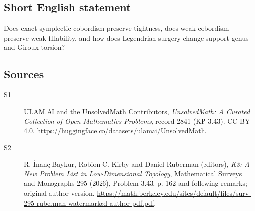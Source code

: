 \documentclass[11pt]{article}
\begin{document}
\subsection{Short English statement}
Does exact symplectic cobordism preserve tightness, does weak cobordism preserve weak fillability, and how does Legendrian surgery change support genus and Giroux torsion?
\subsection{Sources}
\begin{description}
\item[\hypertarget{source:2841:1}{S1}] ULAM.AI and the UnsolvedMath Contributors, \emph{UnsolvedMath: A Curated Collection of Open Mathematics Problems}, record 2841 (KP-3.43). CC BY 4.0. \url{https://huggingface.co/datasets/ulamai/UnsolvedMath}.
\item[\hypertarget{source:2841:2}{S2}] R. İnanç Baykur, Robion C. Kirby and Daniel Ruberman (editors), \emph{K3: A New Problem List in Low-Dimensional Topology}, Mathematical Surveys and Monographs 295 (2026), Problem 3.43, p. 162 and following remarks; original author version. \url{https://math.berkeley.edu/sites/default/files/surv-295-ruberman-watermarked-author-pdf.pdf}.
\end{description}
\label{end:2841}
\end{document}
